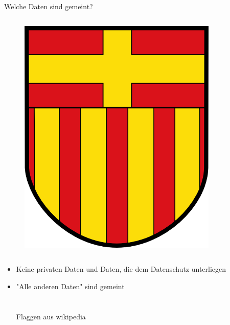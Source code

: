 \begin{frame}[t]{Welche Daten sind gemeint?}
\begin{columns}
  \begin{figure}[h]
   \centering
   \includegraphics[scale=0.25]{section_open_data_flag_paderborn.png}
  \end{figure}
 \end{columns}
 
 \begin{block}{}
 \begin{itemize}
  \item Keine privaten Daten und Daten, die dem Datenschutz unterliegen
  \item "Alle anderen Daten" sind gemeint\\
  ~\\~\\Flaggen aus wikipedia \cite{flags}
 \end{itemize}
 \end{block}
\end{frame}


